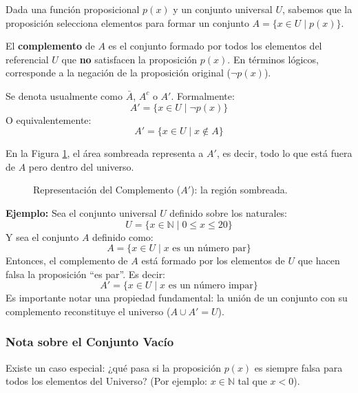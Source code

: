 Dada una función proposicional $p(x)$ y un conjunto universal $U$, sabemos que la proposición selecciona elementos para formar un conjunto $A = \{x \in U \mid p(x)\}$.

El \textbf{complemento} de $A$ es el conjunto formado por todos los elementos del referencial $U$ que \textbf{no} satisfacen la proposición $p(x)$. En términos lógicos, corresponde a la negación de la proposición original ($\neg p(x)$).

Se denota usualmente como $\bar{A}$, $A^c$ o $A'$. Formalmente:
\[ A' = \{ x\in U \mid \neg p(x) \} \]
O equivalentemente:
\[ A' = \{ x \in U \mid x \notin A \} \]

En la Figura \ref{figura:complemento}, el área sombreada representa a $A'$, es decir, todo lo que está fuera de $A$ pero dentro del universo.

\begin{figure}[ht]
\centering
{}
\caption{Representación del Complemento ($A'$): la región sombreada.}\label{figura:complemento}
\end{figure}

\noindent \textbf{Ejemplo:}
Sea el conjunto universal $U$ definido sobre los naturales:
\[ U=\{x \in \mathbb{N} \mid 0\leq x \leq 20 \} \]
Y sea el conjunto $A$ definido como:
\[ A=\{x\in U \mid x \text{ es un número par}\} \]
Entonces, el complemento de $A$ está formado por los elementos de $U$ que hacen falsa la proposición ``es par''. Es decir:
\[ A'= \{x\in U \mid x \text{ es un número impar}\} \]
Es importante notar una propiedad fundamental: la unión de un conjunto con su complemento reconstituye el universo ($A \cup A' = U$).

\subsubsection*{Nota sobre el Conjunto Vacío}

Existe un caso especial: ¿qué pasa si la proposición $p(x)$ es siempre falsa para todos los elementos del Universo? (Por ejemplo: $x \in \mathbb{N}$ tal que $x < 0$).

